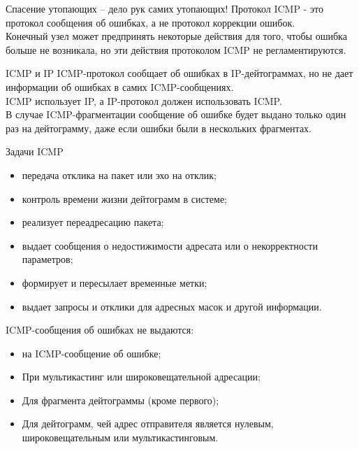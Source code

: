 \begin{frame}{Спасение утопающих -- дело рук самих утопающих!}
	Протокол ICMP - это протокол сообщения об ошибках,  а не протокол коррекции ошибок.\\
	\bigskip
	Конечный узел может предпринять некоторые действия для того,  чтобы ошибка больше не возникала,  но эти действия протоколом ICMP не регламентируются.
\end{frame}

\begin{frame}{ICMP и IP}
	ICMP-протокол сообщает об ошибках в IP-дейтограммах,  но не дает информации об ошибках в самих ICMP-сообщениях.\\
	\pause
	\bigskip
	ICMP использует IP,  а IP-протокол должен использовать ICMP.\\
	\pause
	\bigskip
	В случае ICMP-фрагментации сообщение об ошибке будет выдано только один раз на дейтограмму,  даже если ошибки были в нескольких фрагментах.	
\end{frame}

\begin{frame}{Задачи ICMP}
	\begin{itemize}
		\item передача отклика на пакет или эхо на отклик;
		\item контроль времени жизни дейтограмм в системе;
		\item реализует переадресацию пакета;
		\item выдает сообщения о недостижимости адресата или о некорректности параметров;
		\item формирует и пересылает временные метки;
		\item выдает запросы и отклики для адресных масок и другой информации.
	\end{itemize}
\end{frame}

\begin{frame}
ICMP-сообщения об ошибках не выдаются:
	\begin{itemize}
		\item на ICMP-сообщение об ошибке;
		\item При мультикастинг или широковещательной адресации;
		\item Для фрагмента дейтограммы (кроме первого);
		\item Для дейтограмм,  чей адрес отправителя является нулевым,  широковещательным или мультикастинговым.
	\end{itemize}
\end{frame}

